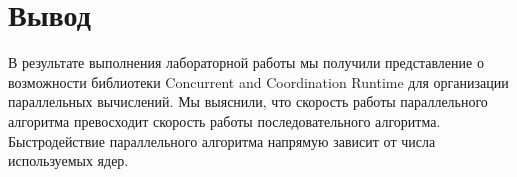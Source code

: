 \documentclass[russian,utf8,pointsection]{eskdtext}
\begin{document}
       	\begin{figure}[!h]
       		\caption{}
       		\label{ris:1_2}
       	\end{figure}       	

    \newpage    	   	
	\section{Вывод}
	В результате выполнения лабораторной работы мы получили представление о возможности библиотеки Concurrent and Coordination Runtime для организации параллельных вычислений.
	Мы выяснили, что скорость работы параллельного алгоритма превосходит скорость работы последовательного алгоритма. Быстродействие параллельного алгоритма напрямую зависит от числа используемых ядер.
		
\end{document}
